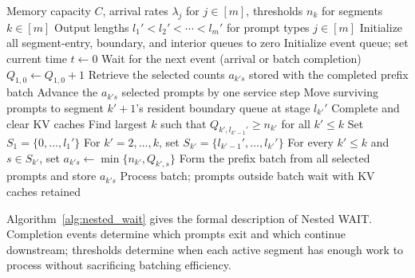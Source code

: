 \begin{algorithm}[h]
\caption{Nested WAIT: Nested Waiting for Accumulated Inference Threshold}
\label{alg:nested_wait}
{\small\linespread{1.0}\selectfont
\begin{algorithmic}[1]
\Require Memory capacity \( C \), arrival rates \( \lambda_j \) for \( j \in [m] \), thresholds \( n_k \) for segments \( k \in [m] \)
\Require Output lengths \( l_1' < l_2' < \cdots < l_m' \) for prompt types \( j \in [m] \)
    \Statex {}
    \Statex {}
    \State Initialize all segment-entry, boundary, and interior queues to zero
\State Initialize event queue; set current time \( t \gets 0 \)
    \State Wait for the next event (arrival or batch completion)
        \State \( Q_{1,0} \gets Q_{1,0} + 1 \)  
        \State Retrieve the selected counts \(a_{k's}\) stored with the completed prefix batch
            \State Advance the \(a_{k's}\) selected prompts by one service step
        \EndFor
                \State Move surviving prompts to segment \( k'+1 \)'s resident boundary queue at stage \( l_{k'}' \)
            \Else
                \State Complete and clear KV caches
            \EndIf
        \EndIf
        \EndFor
    \EndIf
    \State Find largest \( k \) such that \( Q_{k', l_{k'-1}'} \geq n_{k'} \) for all \( k' \leq k \) 
        \State Set \(S_1=\{0,\ldots,l_1'\}\)
        \State For \(k'=2,\ldots,k\), set \(S_{k'}=\{l_{k'-1}',\ldots,l_{k'}'\}\)
        \State For every \(k'\le k\) and \(s\in S_{k'}\), set \(a_{k's}\gets\min\{n_{k'},Q_{k',s}\}\)
        \State Form the prefix batch from all selected prompts and store \(a_{k's}\)
        \State Process batch; prompts outside batch wait with KV caches retained
    \EndIf
\EndWhile
\end{algorithmic}
}
\end{algorithm}

Algorithm~\ref{alg:nested_wait} gives the formal description of Nested WAIT. Completion events determine which prompts exit and which continue downstream; thresholds determine when each active segment has enough work to process without sacrificing batching efficiency.

